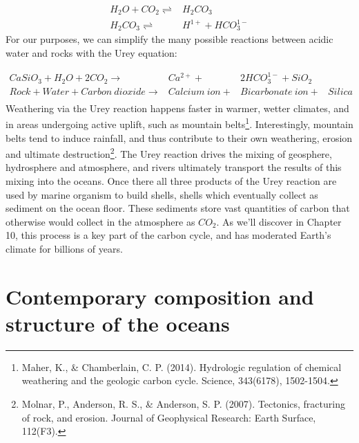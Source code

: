 \begin{align} \label{eq:carbonic}
	H_2O+CO_2 \rightleftharpoons & H_2CO_3\\
	H_2CO_3  \rightleftharpoons & H^{1+} + HCO_3^{1-}
\end{align}
For our purposes, we can simplify the many possible reactions between acidic water and rocks with the Urey equation:

\begin{align} \label{eq:urey}
	CaSiO_3 + H_2O + 2CO_2  \rightarrow & Ca^{2+} + & 2HCO_3^{1-} + SiO_2\\
	Rock + Water + Carbon\ dioxide \rightarrow & Calcium\ ion + &  Bicarbonate\ ion  + & Silica \\
\end{align}
Weathering via the Urey reaction happens faster in warmer, wetter climates, and in areas undergoing active uplift, such as mountain belts\footnote{Maher, K., \& Chamberlain, C. P. (2014). Hydrologic regulation of chemical weathering and the geologic carbon cycle. Science, 343(6178), 1502-1504.}. Interestingly, mountain belts tend to induce rainfall, and thus contribute to their own weathering, erosion and ultimate destruction\footnote{Molnar, P., Anderson, R. S., \& Anderson, S. P. (2007). Tectonics, fracturing of rock, and erosion. Journal of Geophysical Research: Earth Surface, 112(F3).}.  The Urey reaction drives the mixing of geosphere, hydrosphere and atmosphere, and rivers ultimately transport the results of this mixing into the oceans. Once there all three products of the Urey reaction are used by marine organism to build shells, shells which eventually collect as sediment on the ocean floor. These sediments store vast quantities of carbon that otherwise would collect in the atmosphere as $CO_2$. As we'll discover in Chapter 10, this process is a key part of the carbon cycle, and has moderated Earth's climate for billions of years.

\section{Contemporary composition and structure of the oceans} \label{The Contemporary Ocean}

